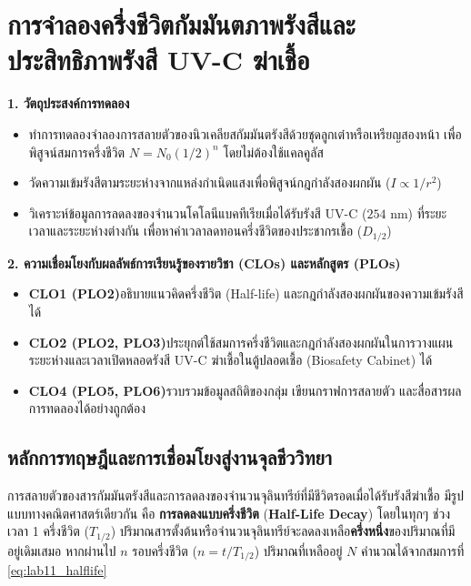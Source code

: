 \chapter{การจำลองครึ่งชีวิตกัมมันตภาพรังสีและประสิทธิภาพรังสี UV-C ฆ่าเชื้อ}

\begin{planbox}
\textbf{1. วัตถุประสงค์การทดลอง}
\begin{itemize}
    \item ทำการทดลองจำลองการสลายตัวของนิวเคลียสกัมมันตรังสีด้วยชุดลูกเต๋าหรือเหรียญสองหน้า เพื่อพิสูจน์สมการครึ่งชีวิต $N = N_0(1/2)^n$ โดยไม่ต้องใช้แคลคูลัส
    \item วัดความเข้มรังสีตามระยะห่างจากแหล่งกำเนิดแสงเพื่อพิสูจน์กฎกำลังสองผกผัน ($I \propto 1/r^2$)
    \item วิเคราะห์ข้อมูลการลดลงของจำนวนโคโลนีแบคทีเรียเมื่อได้รับรังสี UV-C ($254\text{ nm}$) ที่ระยะเวลาและระยะห่างต่างกัน เพื่อหาค่าเวลาลดทอนครึ่งชีวิตของประชากรเชื้อ ($D_{1/2}$)
\end{itemize}
\textbf{2. ความเชื่อมโยงกับผลลัพธ์การเรียนรู้ของรายวิชา (CLOs) และหลักสูตร (PLOs)}
\begin{itemize}
    \item \textbf{CLO1 (PLO2)}\quad อธิบายแนวคิดครึ่งชีวิต (Half-life) และกฎกำลังสองผกผันของความเข้มรังสีได้
    \item \textbf{CLO2 (PLO2, PLO3)}\quad ประยุกต์ใช้สมการครึ่งชีวิตและกฎกำลังสองผกผันในการวางแผนระยะห่างและเวลาเปิดหลอดรังสี UV-C ฆ่าเชื้อในตู้ปลอดเชื้อ (Biosafety Cabinet) ได้
    \item \textbf{CLO4 (PLO5, PLO6)}\quad รวบรวมข้อมูลสถิติของกลุ่ม เขียนกราฟการสลายตัว และสื่อสารผลการทดลองได้อย่างถูกต้อง
\end{itemize}
\end{planbox}

\section{หลักการทฤษฎีและการเชื่อมโยงสู่งานจุลชีววิทยา}

การสลายตัวของสารกัมมันตรังสีและการลดลงของจำนวนจุลินทรีย์ที่มีชีวิตรอดเมื่อได้รับรังสีฆ่าเชื้อ มีรูปแบบทางคณิตศาสตร์เดียวกัน คือ \textbf{การลดลงแบบครึ่งชีวิต} (\textbf{Half-Life Decay}) โดยในทุกๆ ช่วงเวลา 1 ครึ่งชีวิต ($T_{1/2}$) ปริมาณสารตั้งต้นหรือจำนวนจุลินทรีย์จะลดลงเหลือ\textbf{ครึ่งหนึ่ง}ของปริมาณที่มีอยู่เดิมเสมอ หากผ่านไป $n$ รอบครึ่งชีวิต ($n = t / T_{1/2}$) ปริมาณที่เหลืออยู่ $N$ คำนวณได้จากสมการที่ \eqref{eq:lab11_halflife}

